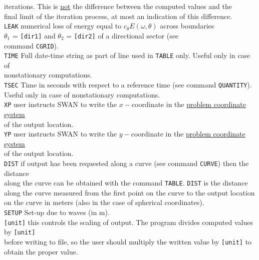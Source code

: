 \documentclass[12pt]{book}
\begin{document}
\begin{tabbing}
                iterations. This is \underline{not} the difference between the computed values and the\\
                final limit of the iteration process, at most an indication of this difference.\-\\
{\tt LEAK}   \> numerical loss of energy equal to $c_{\theta} E(\omega,\theta)$ across boundaries\+\\
                $\theta_1$ = {\tt [dir1]} and $\theta_2$ = {\tt [dir2]} of a directional sector (see\\
                command {\tt CGRID}).\-\\
{\tt TIME}   \> Full date-time string as part of line used in {\tt TABLE} only. Useful only in case of\+\\
                nonstationary computations.\-\\
{\tt TSEC}   \> Time in seconds with respect to a reference time (see command {\tt QUANTITY}).\+\\
                Useful only in case of nonstationary computations.\-\\
{\tt XP}     \> user instructs SWAN to write the $x-$coordinate in the \underline{problem coordinate system}\+\\
                of the output location.\-\\
{\tt YP}     \> user instructs SWAN to write the $y-$coordinate in the \underline{problem coordinate system}\+\\
                of the output location.\-\\
{\tt DIST}   \> if output has been requested along a curve (see command {\tt CURVE}) then the distance\+\\
                along the curve can be obtained with the command {\tt TABLE}. {\tt DIST} is the distance\\
                along the curve measured from the first point on the curve to the output location\\
                on the curve in meters (also in the case of spherical coordinates).\-\\
{\tt SETUP}  \> Set-up due to waves (in m).\\
{\tt [unit]} \> this controls the scaling of output. The program divides computed values by {\tt [unit]}\+\\
                before writing to file, so the user should multiply the written value by {\tt [unit]} to\\
                obtain the proper value.\\

\end{tabbing}
\end{document}
